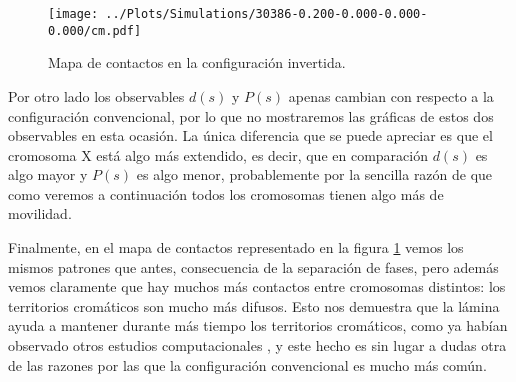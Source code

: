 \begin{figure}[t]
    \centering
    \texttt{[image: ../Plots/Simulations/30386-0.200-0.000-0.000-0.000/cm.pdf]}
    \caption{Mapa de contactos en la configuración invertida.}
    \label{fig:cm_i}
\end{figure}

Por otro lado los observables $d(s)$ y $P(s)$ apenas cambian con respecto a la configuración convencional, por lo que no mostraremos las gráficas de estos dos observables en esta ocasión. La única diferencia que se puede apreciar es que el cromosoma X está algo más extendido, es decir, que en comparación $d(s)$ es algo mayor y $P(s)$ es algo menor, probablemente por la sencilla razón de que como veremos a continuación todos los cromosomas tienen algo más de movilidad.

Finalmente, en el mapa de contactos representado en la figura \ref{fig:cm_i} vemos los mismos patrones que antes, consecuencia de la separación de fases, pero además vemos claramente que hay muchos más contactos entre cromosomas distintos: los territorios cromáticos son mucho más difusos. Esto nos demuestra que la lámina ayuda a mantener durante más tiempo los territorios cromáticos, como ya habían observado otros estudios computacionales \cite{Kinney2018}, y este hecho es sin lugar a dudas otra de las razones por las que la configuración convencional es mucho más común.

